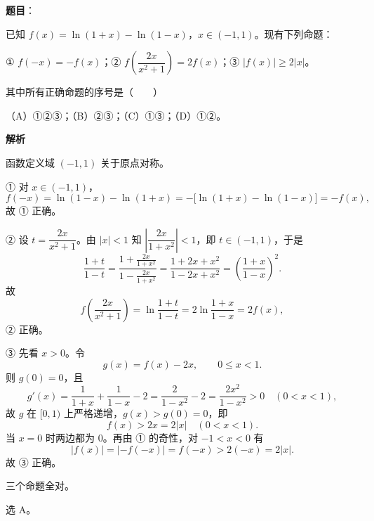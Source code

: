 \begin{answer}

\textbf{题目}：

已知 $f(x)=\ln(1+x)-\ln(1-x)$，$x\in(-1,1)$。现有下列命题：

① $f(-x)=-f(x)$；② $f\left(\dfrac{2x}{x^2+1}\right)=2f(x)$；③ $|f(x)|\geqslant 2|x|$。

其中所有正确命题的序号是\mbox{（　　）}

（A）①②③；（B）②③；（C）①③；（D）①②。

\textbf{解析}

函数定义域 $(-1,1)$ 关于原点对称。

① 对 $x\in(-1,1)$，
\nopagebreak[4]
\[f(-x)=\ln(1-x)-\ln(1+x)=-\bigl[\ln(1+x)-\ln(1-x)\bigr]=-f(x),\]
故 ① 正确。

② 设 $t=\dfrac{2x}{x^2+1}$。由 $|x|<1$ 知 $\left|\dfrac{2x}{1+x^2}\right|<1$，即 $t\in(-1,1)$，于是
\nopagebreak[4]
\[\frac{1+t}{1-t}=\frac{1+\frac{2x}{1+x^2}}{1-\frac{2x}{1+x^2}}
=\frac{1+2x+x^2}{1-2x+x^2}=\left(\frac{1+x}{1-x}\right)^2 .\]
故
\nopagebreak[4]
\[f\left(\frac{2x}{x^2+1}\right)=\ln\frac{1+t}{1-t}
=2\ln\frac{1+x}{1-x}=2f(x),\]
② 正确。

③ 先看 $x>0$。令
\nopagebreak[4]
\[g(x)=f(x)-2x,\qquad 0\leqslant x<1 .\]
则 $g(0)=0$，且
\nopagebreak[4]
\[g'(x)=\frac1{1+x}+\frac1{1-x}-2=\frac{2}{1-x^2}-2=\frac{2x^2}{1-x^2}>0\quad(0<x<1),\]
故 $g$ 在 $[0,1)$ 上严格递增，$g(x)>g(0)=0$，即
\nopagebreak[4]
\[f(x)>2x=2|x|\quad(0<x<1).\]
当 $x=0$ 时两边都为 $0$。再由 ① 的奇性，对 $-1<x<0$ 有
\nopagebreak[4]
\[|f(x)|=|-f(-x)|=f(-x)>2(-x)=2|x| .\]
故 ③ 正确。

三个命题全对。

选 A。


\end{answer}
